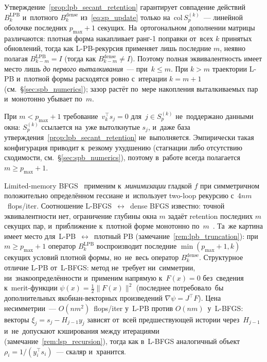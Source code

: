 \begin{remark}\label{rem:lpb_truncation}
Утверждение~\ref{prop:lpb_secant_retention} гарантирует совпадение
действий $B_k^{\mathrm{LPB}}$ и~плотного $B_k^{\mathrm{dense}}$
из~\eqref{eq:sp_update} только на~$\mathrm{col}\,S_p^{(k)}$~--- линейной
оболочке последних $p_{\max}+1$ секущих. На~ортогональном дополнении
матрицы различаются: плотная форма накапливает ранг-1 поправки от~всех
$k$ принятых обновлений, тогда как L-PB-рекурсия применяет лишь
последние $m$, неявно полагая $B_{k-m}^{\mathrm{LPB}} = I$ (тогда
как $B_{k-m}^{\mathrm{dense}}\ne I$). Поэтому полная эквивалентность
имеет место лишь \emph{до первого выталкивания}~--- при~$k\le m$. При
$k>m$ траектории L-PB и~плотной формы расходятся ровно с~итерации
$k=m+1$ (см.~\S\ref{sec:spb_numerics}); зазор растёт по~мере накопления
выталкиваемых пар и~монотонно убывает по~$m$.

При $m<p_{\max}+1$ требование~$v_k^\top s_j=0$ для~$j\in S_p^{(k)}$
не~поддержано данными окна: $S_p^{(k)}$ ссылается на~уже вытолкнутые
$s_j$, и~даже база утверждения~\ref{prop:lpb_secant_retention}
не~выполняется. Эмпирически такая конфигурация приводит к~резкому
ухудшению (стагнации либо отсутствию сходимости, см.~\S\ref{sec:spb_numerics}),
поэтому в~работе всегда полагается $m\ge p_{\max}+1$.
\end{remark}

\begin{remark}\label{rem:lpb_vs_lbfgs}
Limited-memory BFGS~\cite{lbfgs,liu1989,byrd1994} применим к~\emph{минимизации}
гладкой $f$ при симметричном положительно определённом гессиане и~использует
two-loop рекурсию с~$4nm$~flops/iter. Соотношение L-BFGS~$\leftrightarrow$~dense
BFGS известно: точной эквивалентности нет, ограничение глубины окна
$m$ задаёт retention последних $m$ секущих пар, и~приближение к~плотной
форме монотонно по~$m$~\cite[\S 7.2]{bfgs}. Та~же картина имеет место
для~L-PB~$\leftrightarrow$~плотный PB (замечание~\ref{rem:lpb_truncation}):
при~$m\ge p_{\max}+1$ оператор $B_k^{\mathrm{LPB}}$ воспроизводит последние
$\min(p_{\max}+1,k)$ секущих условий плотной формы, но~не~весь оператор
$B_k^{\mathrm{dense}}$.
Структурное отличие L-PB от~L-BFGS: метод не~требует ни~симметрии,
ни~знакоопределённости и~применим напрямую к~$F(x)=0$ без~сведения
к~merit-функции $\psi(x)=\tfrac12\|F(x)\|^2$ (последнее потребовало~бы
дополнительных якобиан-векторных произведений $\nabla\psi = J^\top F$).
Цена несимметрии~--- $O(nm^2)$~flops/iter у~L-PB против $O(nm)$~у~L-BFGS:
векторы $\xi_j=s_j-H_{j-1}y_j$ зависят от~всей предшествующей истории
через~$H_{j-1}$ и~не~допускают кэширования между итерациями
(замечание~\ref{rem:lsp_recursion}), тогда как в~L-BFGS аналогичный
объект $\rho_i = 1/(y_i^\top s_i)$~--- скаляр и~хранится.
\end{remark}

